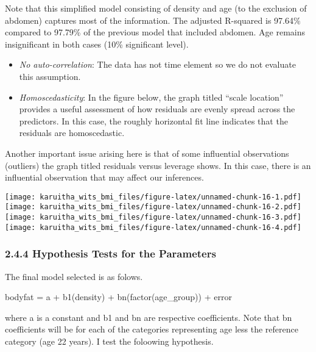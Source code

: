 \documentclass[
]{article}
\begin{document}
Note that this simplified model consisting of density and age (to the
exclusion of abdomen) captures most of the information. The adjusted
R-squared is 97.64\% compared to 97.79\% of the previous model that
included abdomen. Age remains insignificant in both cases (10\%
significant level).

\begin{itemize}
\item
  \emph{No auto-correlation}: The data has not time element so we do not
  evaluate this assumption.
\item
  \emph{Homoscedasticity}: In the figure below, the graph titled ``scale
  location'' provides a useful assessment of how residuals are evenly
  spread across the predictors. In this case, the roughly horizontal fit
  line indicates that the residuals are homoscedastic.
\end{itemize}

Another important issue arising here is that of some influential
observations (outliers) the graph titled residuals versus leverage
shows. In this case, there is an influential observation that may affect
our inferences.

\texttt{[image: karuitha\_wits\_bmi\_files/figure-latex/unnamed-chunk-16-1.pdf]}
\texttt{[image: karuitha\_wits\_bmi\_files/figure-latex/unnamed-chunk-16-2.pdf]}
\texttt{[image: karuitha\_wits\_bmi\_files/figure-latex/unnamed-chunk-16-3.pdf]}
\texttt{[image: karuitha\_wits\_bmi\_files/figure-latex/unnamed-chunk-16-4.pdf]}

\hypertarget{hypothesis-tests-for-the-parameters}{%
\subsubsection{\texorpdfstring{\textbf{2.4.4 Hypothesis Tests for the
Parameters}}{2.4.4 Hypothesis Tests for the Parameters}}\label{hypothesis-tests-for-the-parameters}}

The final model selected is as folows.

bodyfat = a + b1(density) + bn(factor(age\_group)) + error

where a is a constant and b1 and bn are respective coefficients. Note
that bn coefficients will be for each of the categories representing age
less the reference category (age 22 years). I test the foloowing
hypothesis.
\end{document}
